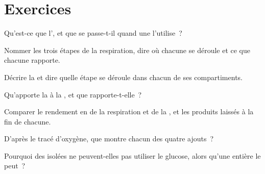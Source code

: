 \section{Exercices}

\begin{exercise}[$\star$]\label{exo:g12:respiration-fermentation:1}
Qu'est-ce que l', et que se passe-t-il quand une  l'utilise~?
\end{exercise}

\begin{exercise}[$\star$]\label{exo:g12:respiration-fermentation:2}
Nommer les trois étapes de la respiration, dire où chacune se déroule
et ce que chacune rapporte.
\end{exercise}

\begin{exercise}[$\star$]\label{exo:g12:respiration-fermentation:3}
Décrire la  et dire quelle étape se déroule dans chacun de
ses compartiments.
\end{exercise}

\begin{exercise}[$\star$]\label{exo:g12:respiration-fermentation:4}
Qu'apporte la  à la , et que rapporte-t-elle~?
\end{exercise}

\begin{exercise}[$\star$]\label{exo:g12:respiration-fermentation:5}
Comparer le rendement en  de la respiration et de la ,
et les produits laissés à la fin de chacune.
\end{exercise}

\begin{exercise}[$\star\star$]\label{exo:g12:respiration-fermentation:6}
D'après le tracé d'oxygène, que montre chacun des quatre ajouts~?
\end{exercise}

\begin{exercise}[$\star\star$]\label{exo:g12:respiration-fermentation:7}
Pourquoi des  isolées ne peuvent-elles pas utiliser le
glucose, alors qu'une  entière le peut~?
\end{exercise}

